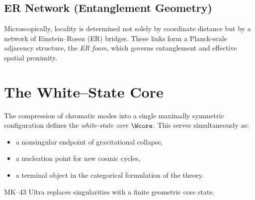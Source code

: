 \subsection{ER Network (Entanglement Geometry)}
Microscopically, locality is determined not solely by coordinate distance but by a network of Einstein--Rosen (ER) bridges. 
These links form a Planck-scale adjacency structure, the \emph{ER foam}, which governs entanglement and effective spatial proximity.

\section{The White--State Core}

The compression of chromatic modes into a single maximally symmetric configuration defines the \emph{white-state core} $\Wcore$. 
This serves simultaneously as:
\begin{itemize}
  \item a nonsingular endpoint of gravitational collapse,
  \item a nucleation point for new cosmic cycles,
  \item a terminal object in the categorical formulation of the theory.
\end{itemize}

MK--43 Ultra replaces singularities with a finite geometric core state.

